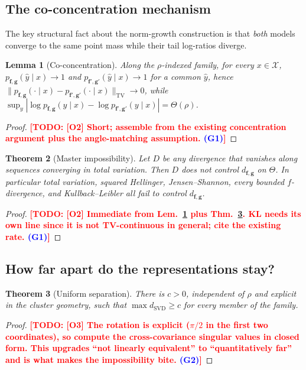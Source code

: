 \documentclass{article}
\newcommand{\TODO}[1]{\textcolor{red}{\textbf{[TODO: #1]}}}
\newcommand{\GATE}[1]{\textcolor{blue}{\textsf{\small (#1)}}}
\newcommand{\X}{\mathcal{X}}
\newcommand{\bff}{\mathbf{f}}
\newcommand{\bfg}{\mathbf{g}}
\newcommand{\dSVD}{d_{\mathrm{SVD}}}
\newcommand{\dfg}{d_{\bff,\bfg}}
\newcommand{\TV}{\mathrm{TV}}
\theoremstyle{plain}
\newtheorem{theorem}{Theorem}
\newtheorem{lemma}[theorem]{Lemma}
\theoremstyle{definition}
\theoremstyle{remark}
\begin{document}
\subsection{The co-concentration mechanism}
\label{sec:mechanism}

The key structural fact about the norm-growth construction is that \emph{both}
models converge to the same point mass while their tail log-ratios diverge.

\begin{lemma}[Co-concentration]
\label{lem:coconc}
Along the $\rho$-indexed family, for every $x\in\X$,
$p_{\bff,\bfg}(\hat y\mid x)\to1$ and $p_{\bff',\bfg'}(\hat y\mid x)\to1$ for a
\emph{common} $\hat y$, hence
$\|p_{\bff,\bfg}(\cdot\mid x)-p_{\bff',\bfg'}(\cdot\mid x)\|_{\TV}\to0$, while
$\sup_{y}|\log p_{\bff,\bfg}(y\mid x)-\log p_{\bff',\bfg'}(y\mid x)|=\Theta(\rho)$.
\end{lemma}
\begin{proof}
\TODO{[O2] Short; assemble from the existing concentration argument plus the
angle-matching assumption. \GATE{G1}}
\end{proof}

\begin{theorem}[Master impossibility]
\label{thm:master}
Let $D$ be any divergence that vanishes along sequences converging in total
variation. Then $D$ does not control $\dfg$ on $\Theta$. In particular total
variation, squared Hellinger, Jensen--Shannon, every bounded $f$-divergence,
and Kullback--Leibler all fail to control $\dfg$.
\end{theorem}
\begin{proof}
\TODO{[O2] Immediate from Lem.~\ref{lem:coconc} plus
Thm.~\ref{thm:lower}. KL needs its own line since it is not TV-continuous in
general; cite the existing rate. \GATE{G1}}
\end{proof}

\subsection{How far apart do the representations stay?}
\label{sec:lower}

\begin{theorem}[Uniform separation]
\label{thm:lower}
There is $c>0$, independent of $\rho$ and explicit in the cluster geometry,
such that $\max\dSVD\ge c$ for every member of the family.
\end{theorem}
\begin{proof}
\TODO{[O3] The rotation is explicit ($\pi/2$ in the first two coordinates), so
compute the cross-covariance singular values in closed form. This upgrades
``not linearly equivalent'' to ``quantitatively far'' and is what makes the
impossibility bite. \GATE{G2}}
\end{proof}
\end{document}
